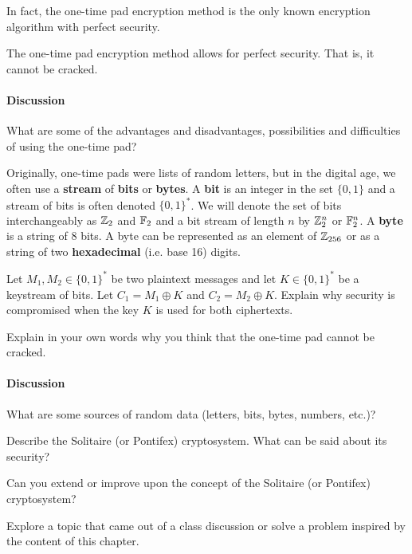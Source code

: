 In fact, the one-time pad encryption method is the only known encryption algorithm with perfect security.

\begin{theorem}
The one-time pad encryption method allows for perfect security. That is, it cannot be cracked.
\end{theorem}

\paragraph*{Discussion} What are some of the advantages and disadvantages, possibilities and difficulties of using the one-time pad?

Originally, one-time pads were lists of random letters, but in the digital age, we often use a {\bf stream} of {\bf bits} or {\bf bytes}. A {\bf bit}  is an integer in the set $\{0, 1\}$ and a stream of bits is often denoted $\{0, 1\}^*$. We will denote the set of bits interchangeably as $\mathbb{Z}_2$ and $\mathbb{F}_2$ and a bit stream  of length $n$ by $\mathbb{Z}_2^n$ or $\mathbb{F}_2^n$. A {\bf byte}  is a string of 8 bits. A byte can be represented as an element of $\mathbb{Z}_{256}$ or as a string of two {\bf hexadecimal} (i.e. base 16) digits.


\begin{problem}  [10 points]
Let $M_1, M_2\in\{0,1\}^*$ be two plaintext messages and let $K\in\{0,1\}^*$ be a keystream of bits. Let $C_1 = M_1\oplus K$ and $C_2 = M_2\oplus K$. Explain why security is compromised when the key $K$ is used for both ciphertexts.
\end{problem}

\begin{problem}  [10 points]
Explain in your own words why you think that the one-time pad cannot be cracked.
\end{problem}

\paragraph*{Discussion} What are some sources of random data (letters, bits, bytes, numbers, etc.)?

\begin{problem}[15 points]
Describe the Solitaire (or Pontifex) cryptosystem. What can be said about its security?
\end{problem}

\begin{problem}[15 points]
Can you extend or improve upon the concept of the Solitaire (or Pontifex) cryptosystem?
\end{problem}

\begin{problem} [10 points]
Explore a topic that came out of a class discussion or solve a problem inspired by the content of this chapter.
\end{problem}
